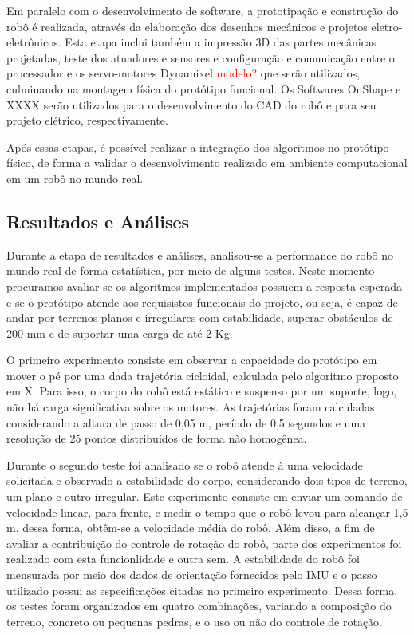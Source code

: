\documentclass[../main.tex]{subfiles}
\begin{document}
  Em paralelo com o desenvolvimento de software, a prototipação e construção do robô é realizada, através da elaboração dos desenhos mecânicos e projetos eletro-eletrônicos. Esta etapa inclui também a impressão 3D das partes mecânicas projetadas, teste dos atuadores e sensores e configuração e comunicação entre o processador e os servo-motores Dynamixel \textcolor{red}{modelo?} que serão utilizados, culminando na montagem física do protótipo funcional. Os Softwares OnShape e XXXX serão utilizados para o desenvolvimento do CAD do robô e para seu projeto elétrico, respectivamente.

  Após essas etapas, é possível realizar a integração dos algoritmos no protótipo físico, de forma a validar o desenvolvimento realizado em ambiente computacional em um robô no mundo real.

  \subsection{Resultados e Análises}
  Durante a etapa de resultados e análises, analisou-se a performance do robô no mundo real de forma estatística, por meio de alguns testes. Neste momento procuramos avaliar se os algoritmos implementados possuem a resposta esperada e se o protótipo atende aos requisistos funcionais do projeto, ou seja, é capaz de andar por terrenos planos e irregulares com estabilidade, superar obstáculos  de 200 mm e de suportar uma carga de até 2 Kg.

  O primeiro experimento consiste em observar a capacidade do protótipo em mover o pé por uma dada trajetória cicloidal, calculada pelo algoritmo proposto em X. Para isso, o corpo do robô está estático e suspenso por um suporte, logo, não há carga significativa sobre os motores. As trajetórias foram calculadas considerando a altura de passo de 0,05 m, período de 0,5 segundos e uma resolução de 25 pontos distribuídos de forma não homogênea. 
  
  Durante o segundo teste foi analisado se o robô atende à uma velocidade solicitada e observado a estabilidade do corpo, considerando dois tipos de terreno, um plano e outro irregular. Este experimento consiste em enviar um comando de velocidade linear, para frente, e medir o tempo que o robô levou para alcançar 1,5 m, dessa forma, obtêm-se a velocidade média do robô.  Além disso, a fim de avaliar a contribuição do controle de rotação do robô, parte dos experimentos foi realizado com esta funcionlidade e outra sem. A estabilidade do robô foi mensurada por meio dos dados de orientação fornecidos pelo IMU e o passo utilizado possui as especificações citadas no primeiro experimento. Dessa forma, os testes foram organizados em quatro combinações, variando a composição do terreno, concreto ou pequenas pedras, e o uso ou não do controle de rotação.
  
\end{document}
